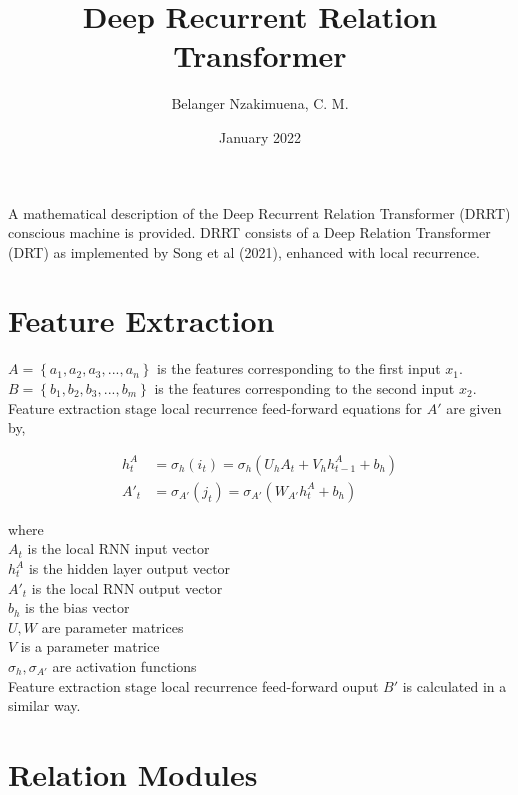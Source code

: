 \documentclass{article}
\title{Deep Recurrent Relation Transformer}
\author{Belanger Nzakimuena, C. M.}
\date{January 2022}
\begin{document}
\maketitle

\noindent A mathematical description of the Deep Recurrent Relation Transformer (DRRT) conscious machine is provided.  DRRT consists of a Deep Relation Transformer (DRT) as implemented by Song et al (2021), enhanced with local recurrence.

\section{Feature Extraction}

\noindent $A = \left\{a_{1}, a_{2}, a_{3}, ..., a_{n}\right\}$ is the features corresponding to the first input $x_{1}$. \\
\noindent $B = \left\{b_{1}, b_{2}, b_{3}, ..., b_{m}\right\}$ is the features corresponding to the second input $x_{2}$. \\

\noindent Feature extraction stage local recurrence feed-forward equations for $A'$ are given by,

\begin{align}
h_{t}^{A} &= \sigma_{h}(i_{t}) = \sigma_{h}(U_{h}A_{t}+V_{h}h_{t-1}^{A}+b_{h}) \\
A'_{t} &= \sigma_{A'}(j_{t}) = \sigma_{A'}(W_{A'}h_{t}^{A}+b_{h})
\end{align}

where \\

\indent\indent $A_{t}$ is the local RNN input vector \\
\indent\indent $h_{t}^{A}$ is the hidden layer output vector \\
\indent\indent $A'_{t}$ is the local RNN output vector \\
\indent\indent $b_{h}$ is the bias vector \\
\indent\indent $U, W$ are parameter matrices \\
\indent\indent $V$ is a parameter matrice \\
\indent\indent $\sigma_{h}, \sigma_{A'}$ are activation functions \\

\noindent Feature extraction stage local recurrence feed-forward ouput $B'$ is calculated in a similar way.

\section{Relation Modules}
\end{document}
